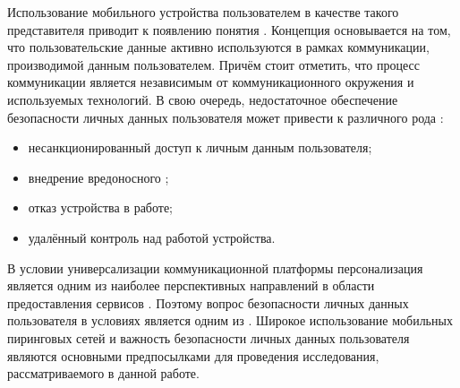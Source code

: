 %
Использование мобильного устройства пользователем в качестве такого представителя приводит к появлению понятия  .
%
Концепция  основывается на том, что пользовательские данные активно используются в рамках коммуникации, производимой данным пользователем.
%
Причём стоит отметить, что процесс коммуникации является независимым от коммуникационного окружения и используемых технологий.
%
В свою очередь, недостаточное обеспечение безопасности личных данных пользователя может привести к различного рода  :
\begin{itemize}
	\item несанкционированный доступ к личным данным пользователя;
	\item внедрение вредоносного ;
	\item отказ устройства в работе;
	\item удалённый контроль над работой устройства.
\end{itemize}

%
В условии универсализации коммуникационной платформы персонализация является одним из наиболее перспективных направлений в области предоставления сервисов .
%
Поэтому вопрос безопасности личных данных пользователя в условиях является одним из .
%
Широкое использование мобильных пиринговых сетей и важность безопасности личных данных пользователя являются основными предпосылками для проведения исследования, рассматриваемого в данной работе.